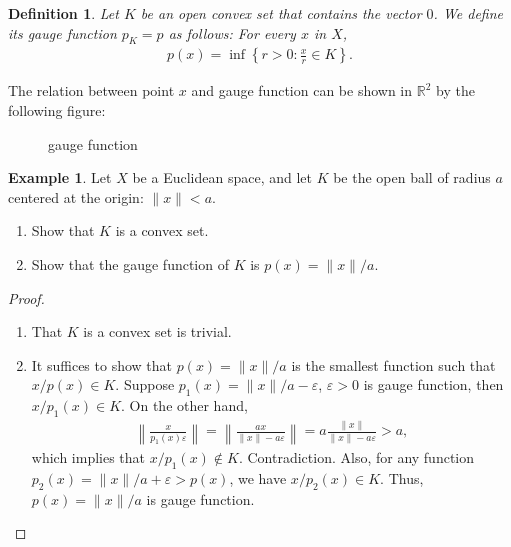 \documentclass[11pt]{book}
\newtheorem{definition}{Definition}[section]
\theoremstyle{definition}
\newtheorem{example}{Example}[section]
\numberwithin{equation}{chapter}
\begin{document}
\medskip

\begin{definition}\label{gauge_function_def}
Let $K$ be an open convex set that contains the vector $0$. We define its gauge function $p_K = p$ as follows: For every $x$ in $X$, 
\begin{align*}
    p(x) = \inf \left\{r > 0 : \frac{x}{r} \in K\right\}.
\end{align*}
\end{definition}
The relation between point $x$ and gauge function can be shown in $\mathbb{R}^2$ by the following figure: \\
\begin{figure}[h]
    \centering
    \caption{gauge function}
    \label{fig:plot_3}
\end{figure}

\medskip

\begin{example}
Let $X$ be a Euclidean space, and let $K$ be the open ball of radius $a$ centered at the origin: $\|x\| < a$.
\begin{enumerate}[label=(\arabic*)]
    \item Show that $K$ is a convex set.
    
    \item Show that the gauge function of $K$ is $p(x) = \|x\|/a$.
\end{enumerate}
\end{example}
\begin{proof}
~\begin{enumerate}[label=(\arabic*)]
    \item That $K$ is a convex set is trivial.
    
    \item It suffices to show that $p(x) = \|x\|/a$ is the smallest function such that $x/p(x) \in K$. Suppose $p_1(x) = \|x\|/a - \varepsilon$, $\varepsilon > 0$ is gauge function, then $x/p_1(x) \in K$. On the other hand,
    \begin{align*}
        \left\|\frac{x}{p_1(x) \varepsilon} \right\| = \left\|\frac{ax}{\|x\| - a \varepsilon} \right\| = a \frac{\|x\|}{\|x\| - a \varepsilon} > a,
    \end{align*}
    which implies that $x/p_1(x) \notin K$. Contradiction. 
    Also, for any function $p_2(x) = \|x\|/a + \varepsilon > p(x)$, we have $x/p_2(x) \in K$. Thus, $p(x) = \|x\|/a$ is gauge function.
\end{enumerate}
\end{proof}
\end{document}
